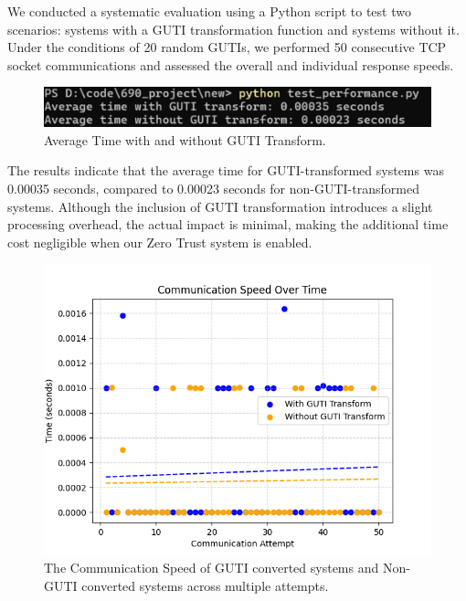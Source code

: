 \documentclass[sigplan,screen]{acmart}
\begin{document}
We conducted a systematic evaluation using a Python script to test two scenarios: systems with a GUTI transformation function and systems without it. Under the conditions of 20 random GUTIs, we performed 50 consecutive TCP socket communications and assessed the overall and individual response speeds.

\begin{figure}[htbp]
\centering
\includegraphics[width=\linewidth]{averageTime1.png}
\caption{Average Time with and without GUTI Transform.}
\end{figure}

The results indicate that the average time for GUTI-transformed systems was 0.00035 seconds, compared to 0.00023 seconds for non-GUTI-transformed systems. Although the inclusion of GUTI transformation introduces a slight processing overhead, the actual impact is minimal, making the additional time cost negligible when our Zero Trust system is enabled.

\begin{figure}[htbp]
\centering
\includegraphics[width=\linewidth]{communicationSpeed.png}
\caption{The Communication Speed of GUTI converted systems and Non-GUTI converted systems across multiple attempts.}
\end{figure}
\end{document}
